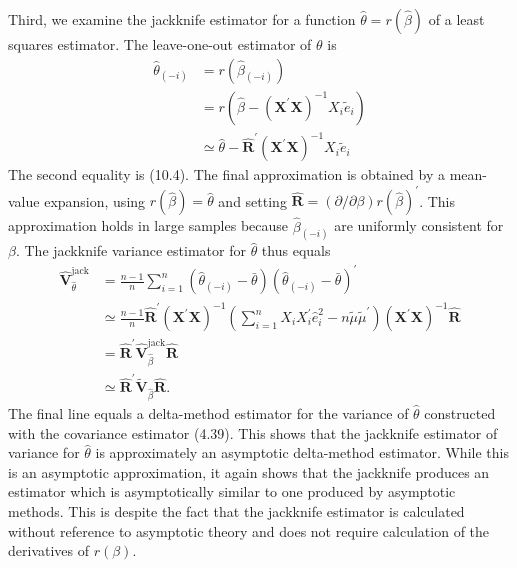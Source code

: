 \documentclass[10pt]{article}
\begin{document}
Third, we examine the jackknife estimator for a function $\widehat{\theta}=r(\widehat{\beta})$ of a least squares estimator. The leave-one-out estimator of $\theta$ is
$$
\begin{aligned}
\widehat{\theta}_{(-i)} &=r\left(\widehat{\beta}_{(-i)}\right) \\
&=r\left(\widehat{\beta}-\left(\boldsymbol{X}^{\prime} \boldsymbol{X}\right)^{-1} X_{i} \widetilde{e}_{i}\right) \\
& \simeq \widehat{\theta}-\widehat{\boldsymbol{R}}^{\prime}\left(\boldsymbol{X}^{\prime} \boldsymbol{X}\right)^{-1} X_{i} \widetilde{e}_{i}
\end{aligned}
$$
The second equality is (10.4). The final approximation is obtained by a mean-value expansion, using $r(\widehat{\beta})=\widehat{\theta}$ and setting $\widehat{\boldsymbol{R}}=(\partial / \partial \beta) r(\widehat{\beta})^{\prime}$. This approximation holds in large samples because $\widehat{\beta}_{(-i)}$ are uniformly consistent for $\beta$. The jackknife variance estimator for $\widehat{\theta}$ thus equals
$$
\begin{aligned}
\widehat{\boldsymbol{V}}_{\widehat{\theta}}^{\mathrm{jack}} &=\frac{n-1}{n} \sum_{i=1}^{n}\left(\widehat{\theta}_{(-i)}-\bar{\theta}\right)\left(\widehat{\theta}_{(-i)}-\bar{\theta}\right)^{\prime} \\
& \simeq \frac{n-1}{n} \widehat{\boldsymbol{R}}^{\prime}\left(\boldsymbol{X}^{\prime} \boldsymbol{X}\right)^{-1}\left(\sum_{i=1}^{n} X_{i} X_{i}^{\prime} \widehat{e}_{i}^{2}-n \widetilde{\mu} \widetilde{\mu}^{\prime}\right)\left(\boldsymbol{X}^{\prime} \boldsymbol{X}\right)^{-1} \widehat{\boldsymbol{R}} \\
&=\widehat{\boldsymbol{R}}^{\prime} \widehat{\boldsymbol{V}}_{\widehat{\beta}}^{\mathrm{jack}} \widehat{\boldsymbol{R}} \\
& \simeq \widehat{\boldsymbol{R}}^{\prime} \widetilde{\boldsymbol{V}}_{\widehat{\beta}} \widehat{\boldsymbol{R}} .
\end{aligned}
$$
The final line equals a delta-method estimator for the variance of $\widehat{\theta}$ constructed with the covariance estimator (4.39). This shows that the jackknife estimator of variance for $\widehat{\theta}$ is approximately an asymptotic delta-method estimator. While this is an asymptotic approximation, it again shows that the jackknife produces an estimator which is asymptotically similar to one produced by asymptotic methods. This is despite the fact that the jackknife estimator is calculated without reference to asymptotic theory and does not require calculation of the derivatives of $r(\beta)$.
\end{document}
